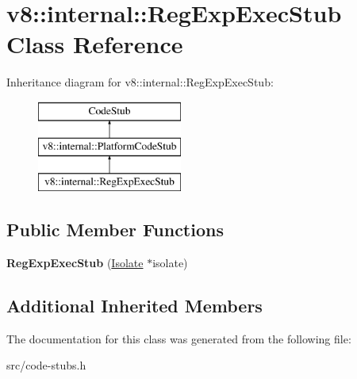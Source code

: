 \hypertarget{classv8_1_1internal_1_1_reg_exp_exec_stub}{}\section{v8\+:\+:internal\+:\+:Reg\+Exp\+Exec\+Stub Class Reference}
\label{classv8_1_1internal_1_1_reg_exp_exec_stub}
Inheritance diagram for v8\+:\+:internal\+:\+:Reg\+Exp\+Exec\+Stub\+:\begin{figure}[H]
\begin{center}
\leavevmode
\includegraphics[height=3.000000cm]{classv8_1_1internal_1_1_reg_exp_exec_stub}
\end{center}
\end{figure}
\subsection*{Public Member Functions}
\begin{DoxyCompactItemize}
\item 
\hypertarget{classv8_1_1internal_1_1_reg_exp_exec_stub_a78d42ac5fdc91baf773cd5927eec7e92}{}{\bfseries Reg\+Exp\+Exec\+Stub} (\hyperlink{classv8_1_1internal_1_1_isolate}{Isolate} $\ast$isolate)\label{classv8_1_1internal_1_1_reg_exp_exec_stub_a78d42ac5fdc91baf773cd5927eec7e92}

\end{DoxyCompactItemize}
\subsection*{Additional Inherited Members}


The documentation for this class was generated from the following file\+:\begin{DoxyCompactItemize}
\item 
src/code-\/stubs.\+h\end{DoxyCompactItemize}
